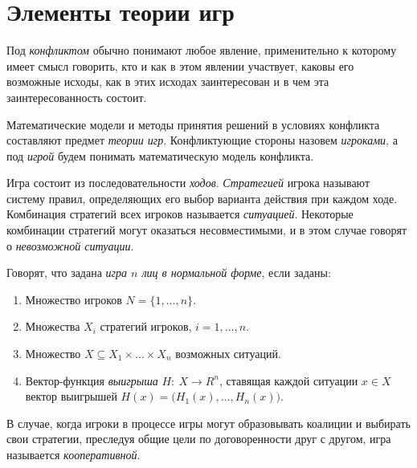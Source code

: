 \section{Элементы теории игр}

\begin{definition}[Конфликт]
	Под \emph{конфликтом} обычно понимают любое явление, применительно к которому имеет смысл говорить, кто и как в этом явлении участвует, каковы его возможные исходы, как в этих исходах заинтересован и в чем эта заинтересованность состоит.
\end{definition}

\begin{definition}
	Математические модели и методы принятия решений в условиях конфликта составляют предмет \emph{теории игр}. Конфликтующие стороны назовем \emph{игроками}, а под \emph{игрой} будем понимать математическую модель конфликта.
\end{definition}

\begin{definition}
	Игра состоит из последовательности \emph{ходов}. \emph{Стратегией} игрока называют систему правил, определяющих его выбор варианта действия при каждом ходе. Комбинация стратегий всех игроков называется \emph{ситуацией}. Некоторые комбинации стратегий могут оказаться несовместимыми, и в этом случае говорят о \emph{невозможной ситуации}.
\end{definition}

\begin{definition}
	Говорят, что задана \emph{игра $n$ лиц в нормальной форме}, если заданы:
	\begin{enumerate}
		\item Множество игроков $N = \{1,\ldots ,n\}$.
		\item Множества $X_i$ стратегий игроков, $i = 1,\ldots ,n$.
		\item Множество $X \subseteq X_1 \times \ldots \times X_n $ возможных ситуаций.
		\item Вектор-функция \emph{выигрыша} $H: \ X \rightarrow R^n$, ставящая каждой ситуации $x \in X$ вектор выигрышей $H(x) = \big(H_1(x),\ldots ,H_n(x)\big)$.
	\end{enumerate}
\end{definition}

\begin{definition}
	В случае, когда игроки в процессе игры могут образовывать коалиции и выбирать свои стратегии, преследуя общие цели по договоренности друг с другом, игра называется \emph{кооперативной}.
\end{definition}

